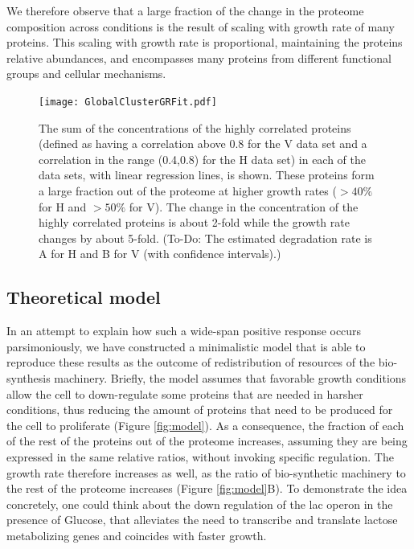 \documentclass[notitlepage]{article}
\begin{document}
We therefore observe that a large fraction of the change in the proteome composition across conditions is the result of scaling with growth rate of many proteins.
This scaling with growth rate is proportional, maintaining the proteins relative abundances, and encompasses many proteins from different functional groups and cellular mechanisms.

\begin{figure}[h]
\centering
\texttt{[image: GlobalClusterGRFit.pdf]}
\caption{
The sum of the concentrations of the highly correlated proteins (defined as having a correlation above 0.8 for the V data set and a correlation in the range (0.4,0.8) for the H data set) in each of the data sets, with linear regression lines, is shown.
These proteins form a large fraction out of the proteome at higher growth rates ($>40\%$ for H and $>50\%$ for V).
The change in the concentration of the highly correlated proteins is about 2-fold while the growth rate changes by about 5-fold.
(To-Do: The estimated degradation rate is A for H and B for V (with confidence intervals).)
}
\label{fig:globalgrcorr}
\end{figure}


\subsection{Theoretical model}
In an attempt to explain how such a wide-span positive response occurs parsimoniously, we have constructed a minimalistic model that is able to reproduce these results as the outcome of redistribution of resources of the bio-synthesis machinery.
Briefly, the model assumes that favorable growth conditions allow the cell to down-regulate some proteins that are needed in harsher conditions, thus reducing the amount of proteins that need to be produced for the cell to proliferate (Figure \ref{fig:model}).
As a consequence, the fraction of each of the rest of the proteins out of the proteome increases, assuming they are being expressed in the same relative ratios, without invoking specific regulation.
The growth rate therefore increases as well, as the ratio of bio-synthetic machinery to the rest of the proteome increases (Figure \ref{fig:model}B).
To demonstrate the idea concretely, one could think about the down regulation of the lac operon in the presence of Glucose, that alleviates the need to transcribe and translate lactose metabolizing genes and coincides with faster growth.
\end{document}
